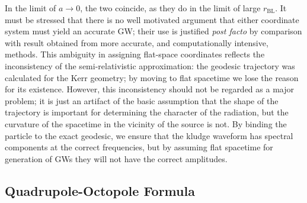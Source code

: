 \documentclass[a4paper, 11pt, titlepage, twoside]{report}
\newcommand{\sub}[1]{\ensuremath{_\mathrm{#1}}}
\begin{document}
In the limit of $a \rightarrow 0$, the two coincide, as they do in the limit of large $r\sub{BL}$. It must be stressed that there is no well motivated argument that either coordinate system must yield an accurate GW; their use is justified {\it post facto} by comparison with result obtained from more accurate, and computationally intensive, methods\cite{Gair2005, Babak2007}. This ambiguity in assigning flat-space coordinates reflects the inconsistency of the semi-relativistic approximation: the geodesic trajectory was calculated for the Kerr geometry; by moving to flat spacetime we lose the reason for its existence. However, this inconsistency should not be regarded as a major problem; it is just an artifact of the basic assumption that the shape of the trajectory is important for determining the character of the radiation, but the curvature of the spacetime in the vicinity of the source is not. By binding the particle to the exact geodesic, we ensure that the kludge waveform has spectral components at the correct frequencies, but by assuming flat spacetime for generation of GWs they will not have the correct amplitudes.

\subsection{Quadrupole-Octopole Formula}
\end{document}
